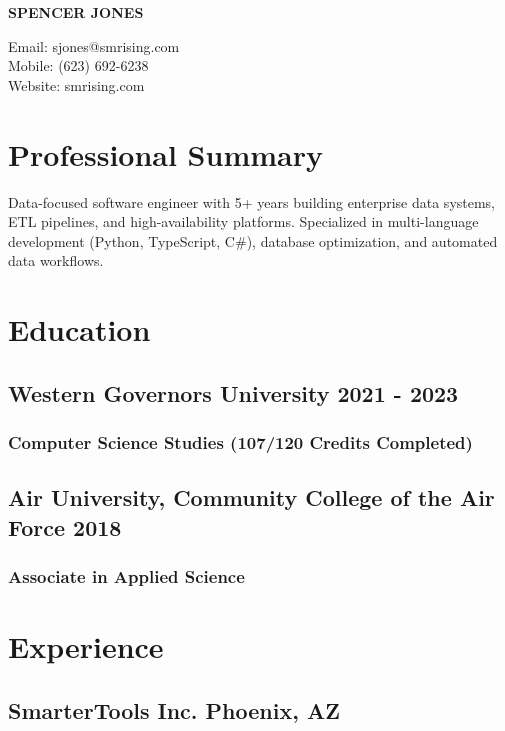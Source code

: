 \documentclass[11pt]{article} %
\begin{document}
\begin{center}
	\begin{minipage}{0.55\textwidth}
		{\Huge\bfseries SPENCER JONES}
	\end{minipage}
	\begin{minipage}{0.4\textwidth}
		\raggedleft
		Email: sjones@smrising.com \\
		Mobile: (623) 692-6238 \\
        Website: smrising.com \\
	\end{minipage} \hfill
\end{center}

\section{Professional Summary}
\noindent Data-focused software engineer with 5+ years building enterprise data systems, ETL pipelines, and high-availability platforms. Specialized in multi-language development (Python, TypeScript, C\#), database optimization, and automated data workflows.

\section{Education}
\subsection{Western Governors University \hfill 2021 - 2023}
\subsubsection{Computer Science Studies (107/120 Credits Completed)}
\subsection{Air University, Community College of the Air Force \hfill 2018}
\subsubsection{Associate in Applied Science}
\vspace{0.7em}
\section{Experience}

\subsection*{SmarterTools Inc. \hfill Phoenix, AZ}
\end{document}
